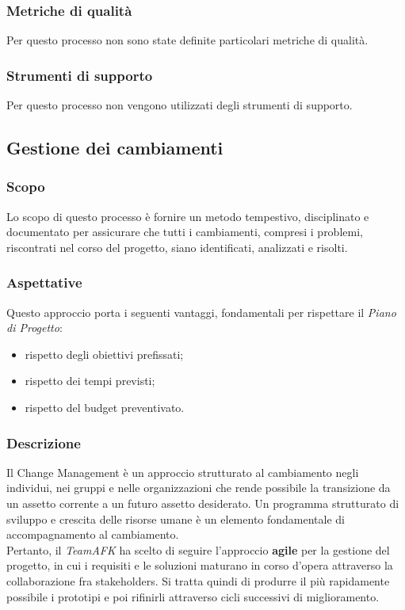 \subsubsection{Metriche di qualità}
Per questo processo non sono state definite particolari metriche di qualità.

\subsubsection{Strumenti di supporto}
Per questo processo non vengono utilizzati degli strumenti di supporto.

\subsection{Gestione dei cambiamenti}
\subsubsection{Scopo}
Lo scopo di questo processo è fornire un metodo tempestivo, disciplinato e documentato per assicurare che tutti i cambiamenti, compresi i problemi, riscontrati nel corso del progetto, siano identificati, analizzati e risolti.

\subsubsection{Aspettative}
Questo approccio porta i seguenti vantaggi, fondamentali per rispettare il \textit{Piano di Progetto}: 
\begin{itemize}
\item rispetto degli obiettivi prefissati;
\item rispetto dei tempi previsti;
\item rispetto del budget preventivato.
\end{itemize}

\subsubsection{Descrizione}
Il Change Management è un approccio strutturato al cambiamento negli individui, nei gruppi e nelle organizzazioni che rende possibile la transizione da un assetto corrente a un futuro assetto desiderato.
Un programma strutturato di sviluppo e crescita delle risorse umane è un elemento fondamentale di accompagnamento al cambiamento.\\ Pertanto, il \textit{TeamAFK} ha scelto di seguire l'approccio \textbf{agile} per la gestione del progetto, in cui i requisiti e le soluzioni maturano in corso d’opera attraverso la collaborazione fra stakeholders. Si tratta quindi di produrre il più rapidamente possibile i prototipi e poi rifinirli attraverso cicli successivi di miglioramento.

